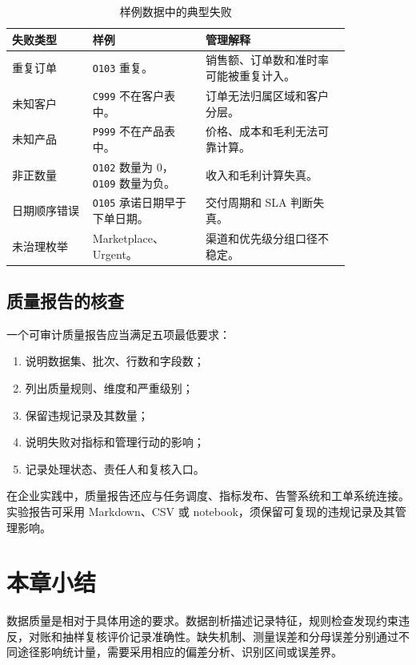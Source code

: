 \begin{table}[htbp]
\centering
\caption{样例数据中的典型失败}
\begin{tabular}{P{0.20\linewidth}P{0.28\linewidth}P{0.36\linewidth}}
\toprule
{}
失败类型 & 样例 & 管理解释\\
\midrule

重复订单 & \texttt{O103} 重复。 & 销售额、订单数和准时率可能被重复计入。\\
未知客户 & \texttt{C999} 不在客户表中。 & 订单无法归属区域和客户分层。\\
未知产品 & \texttt{P999} 不在产品表中。 & 价格、成本和毛利无法可靠计算。\\
非正数量 & \texttt{O102} 数量为 0，\texttt{O109} 数量为负。 & 收入和毛利计算失真。\\
日期顺序错误 & \texttt{O105} 承诺日期早于下单日期。 & 交付周期和 SLA 判断失真。\\
未治理枚举 & Marketplace、Urgent。 & 渠道和优先级分组口径不稳定。\\
\bottomrule
\end{tabular}
\end{table}

\subsection{质量报告的核查}

一个可审计质量报告应当满足五项最低要求：
\begin{enumerate}
  \item 说明数据集、批次、行数和字段数；
  \item 列出质量规则、维度和严重级别；
  \item 保留违规记录及其数量；
  \item 说明失败对指标和管理行动的影响；
  \item 记录处理状态、责任人和复核入口。
\end{enumerate}

在企业实践中，质量报告还应与任务调度、指标发布、告警系统和工单系统连接。实验报告可采用 Markdown、CSV 或 notebook，须保留可复现的违规记录及其管理影响。

\section*{本章小结}

数据质量是相对于具体用途的要求。数据剖析描述记录特征，规则检查发现约束违反，对账和抽样复核评价记录准确性。缺失机制、测量误差和分母误差分别通过不同途径影响统计量，需要采用相应的偏差分析、识别区间或误差界。

